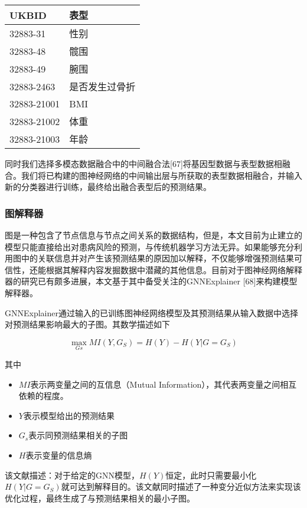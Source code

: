 \documentclass[
]{article}
\begin{document}
\begin{longtable}[]{@{}ll@{}}
\toprule()
\textbf{UKBID} & \textbf{表型} \\
\midrule()
\endhead
32883-31 & 性别 \\
32883-48 & 髋围 \\
32883-49 & 腕围 \\
32883-2463 & 是否发生过骨折 \\
32883-21001 & BMI \\
32883-21002 & 体重 \\
32883-21003 & 年龄 \\
\bottomrule()
\end{longtable}

同时我们选择多模态数据融合中的中间融合法{[}67{]}将基因型数据与表型数据相融合。我们将已构建的图神经网络的中间输出层与所获取的表型数据相融合，并输入新的分类器进行训练，最终给出融合表型后的预测结果。

\hypertarget{ux56feux89e3ux91caux5668}{%
\subsubsection{图解释器}\label{ux56feux89e3ux91caux5668}}

图是一种包含了节点信息与节点之间关系的数据结构，但是，本文目前为止建立的模型只能直接给出对患病风险的预测，与传统机器学习方法无异。如果能够充分利用图中的关联信息并对产生该预测结果的原因加以解释，不仅能够增强预测结果可信性，还能根据其解释内容发掘数据中潜藏的其他信息。目前对于图神经网络解释器的研究已有颇多进展，本文基于其中备受关注的GNNExplainer
{[}68{]}来构建模型解释器。

GNNExplainer通过输入的已训练图神经网络模型及其预测结果从输入数据中选择对预测结果影响最大的子图。其数学描述如下

\[\max_{Gs} MI (Y, G_S) = H(Y) - H(Y|G=G_S)\]

其中

\begin{itemize}
\item
  \(MI\)表示两变量之间的互信息（Mutual
  Information），其代表两变量之间相互依赖的程度。
\item
  \(Y\)表示模型给出的预测结果
\item
  \(G_s\)表示同预测结果相关的子图
\item
  \(H\)表示变量的信息熵
\end{itemize}

该文献描述：对于给定的GNN模型，\(H(Y)\)恒定，此时只需要最小化\( H(Y|G=G_S)\)就可达到解释目的。该文献同时描述了一种变分近似方法来实现该优化过程，最终生成了与预测结果相关的最小子图。
\end{document}
